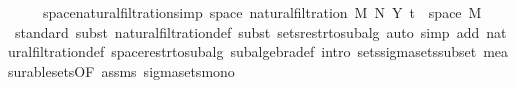 \begin{isabellebody}
\ \ \ \ \ space{\isacharunderscore}{\kern0pt}natural{\isacharunderscore}{\kern0pt}filtration{\isacharbrackleft}{\kern0pt}simp{\isacharbrackright}{\kern0pt}{\isacharcolon}{\kern0pt}\ {\isachardoublequoteopen}space\ {\isacharparenleft}{\kern0pt}natural{\isacharunderscore}{\kern0pt}filtration\ M\ N\ Y\ t{\isacharparenright}{\kern0pt}\ {\isacharequal}{\kern0pt}\ space\ M{\isachardoublequoteclose}\isanewline
%
\isadelimproof
\ \ %
\endisadelimproof
%
\isatagproof
{}\isamarkupfalse%
\ {\isacharparenleft}{\kern0pt}standard{\isacharsemicolon}{\kern0pt}\ {\isacharparenleft}{\kern0pt}subst\ natural{\isacharunderscore}{\kern0pt}filtration{\isacharunderscore}{\kern0pt}def{\isacharcomma}{\kern0pt}\ subst\ sets{\isacharunderscore}{\kern0pt}restr{\isacharunderscore}{\kern0pt}to{\isacharunderscore}{\kern0pt}subalg{\isacharparenright}{\kern0pt}{\isacharparenright}{\kern0pt}\ {\isacharparenleft}{\kern0pt}auto\ simp\ add{\isacharcolon}{\kern0pt}\ natural{\isacharunderscore}{\kern0pt}filtration{\isacharunderscore}{\kern0pt}def\ space{\isacharunderscore}{\kern0pt}restr{\isacharunderscore}{\kern0pt}to{\isacharunderscore}{\kern0pt}subalg\ subalgebra{\isacharunderscore}{\kern0pt}def\ intro{\isacharbang}{\kern0pt}{\isacharcolon}{\kern0pt}\ sets{\isachardot}{\kern0pt}sigma{\isacharunderscore}{\kern0pt}sets{\isacharunderscore}{\kern0pt}subset\ measurable{\isacharunderscore}{\kern0pt}sets{\isacharbrackleft}{\kern0pt}OF\ assms{\isacharbrackright}{\kern0pt}\ sigma{\isacharunderscore}{\kern0pt}sets{\isacharunderscore}{\kern0pt}mono{\isacharparenright}{\kern0pt}%
\endisatagproof
{\isafoldproof}%
%
\isadelimproof
\isanewline
%
\endisadelimproof
%
\isadelimtheory
\isanewline
%
\endisadelimtheory
%
\isatagtheory
{}\isamarkupfalse%
%
\endisatagtheory
{\isafoldtheory}%
%
\isadelimtheory
%
\endisadelimtheory
%
\end{isabellebody}%
\endinput
